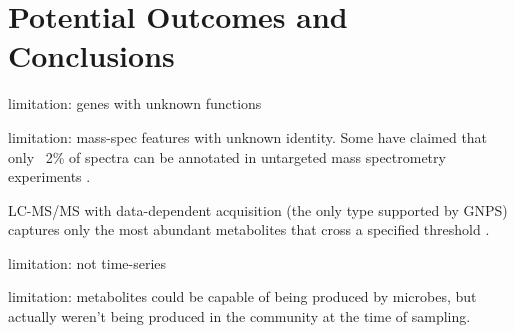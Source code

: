 \documentclass[11pt]{article}
\begin{document}
\section*{Potential Outcomes and Conclusions}

limitation: genes with unknown functions

limitation: mass-spec features with unknown identity. Some have claimed that only ~2\% of spectra can be annotated in untargeted mass spectrometry experiments \cite{da_silva_illuminating_2015}.

LC-MS/MS with data-dependent acquisition (the only type supported by GNPS) captures only the most abundant metabolites that cross a specified threshold \cite{xiao_metabolite_2012}.

limitation: not time-series

limitation: metabolites could be capable of being produced by microbes, but actually weren't being produced in the community at the time of sampling.

\pagebreak
\footnotesize{

\par}
\end{document}
